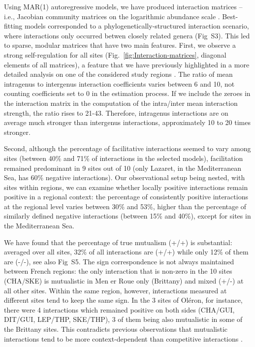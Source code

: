 \documentclass[10pt]{article}
\begin{document}
Using MAR(1) autoregressive models, we have produced interaction matrices
\citep{ives_estimating_2003,hampton2013quantifying} -- i.e., Jacobian
community matrices on the logarithmic abundance scale \citep{ives_estimating_2003}.
Best-fitting models corresponded to a phylogenetically-structured
interaction scenario, where interactions only occurred betwen closely
related genera (Fig~S3). This led to sparse, modular matrices that
have two main features. First, we observe a strong self-regulation
for all sites (Fig.~\ref{fig:Interaction-matrices}, diagonal elements
of all matrices), a feature that we have previously highlighted in
a more detailed analysis on one of the considered study regions \citep{barraquand_coastal_2018}.
The ratio of mean intragenus to intergenus interaction coefficients
varies between 6 and 10, not counting coefficients set to 0 in the
estimation process. If we include the zeroes in the interaction matrix
in the computation of the intra/inter mean interaction strength, the
ratio rises to 21-43. Therefore, intragenus interactions are on average
much stronger than intergenus interactions, approximately 10 to 20
times stronger.

Second, although the percentage of facilitative interactions seemed
to vary among sites (between 40\% and 71\% of interactions in the
selected models), facilitation remained predominant in 9 sites out
of 10 (only Lazaret, in the Mediterranean Sea, has 60\% negative interactions).
Our observational setup being nested, with sites within regions, we
can examine whether locally positive interactions remain positive
in a regional context: the percentage of consistently positive interactions
at the regional level varies between 30\% and 53\%, higher than the
percentage of similarly defined negative interactions (between 15\%
and 40\%), except for sites in the Mediterranean Sea.

We have found that the percentage of true mutualism (+/+) is substantial:
averaged over all sites, 32\% of all interactions are (+/+) while
only 12\% of them are (-/-), see also Fig~S5. The sign correspondence
is not always maintained between French regions: the only interaction
that is non-zero in the 10 sites (CHA/SKE) is mutualistic in Men er
Roue only (Brittany) and mixed (+/-) at all other sites. Within the
same region, however, interactions measured at different sites tend
to keep the same sign. In the 3 sites of Oléron, for instance, there
were 4 interactions which remained positive on both sides (CHA/GUI,
DIT/GUI, LEP/THP, SKE/THP), 3 of them being also mutualistic in some
of the Brittany sites. This contradicts previous observations that
mutualistic interactions tend to be more context-dependent than competitive
interactions \citep{chamberlain_how_2014}.
\end{document}
